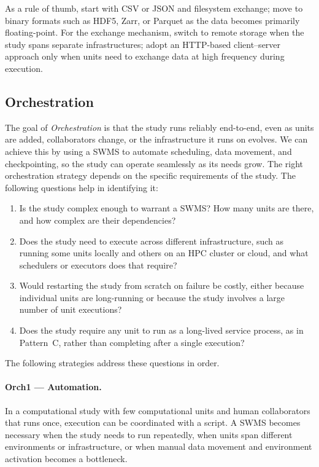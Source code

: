 \documentclass{eceasst}
\begin{document}
As a rule of thumb, start with CSV or JSON and filesystem exchange; move to
binary formats such as HDF5, Zarr, or Parquet as the data becomes
primarily floating-point. For the exchange mechanism, switch to remote storage
when the study spans separate infrastructures; adopt an HTTP-based client--server
approach only when units need to exchange data at high frequency during
execution.


\subsection{Orchestration}
\label{sec:orchestration}

The goal of \emph{Orchestration} is that the study runs reliably end-to-end, even as
units are added, collaborators change, or the infrastructure it runs on evolves.
We can achieve this by using a SWMS to automate
scheduling, data movement, and checkpointing, so the study can operate
seamlessly as its needs grow.
The right orchestration strategy depends on the specific requirements of the
study. The following questions help in identifying it:

\begin{enumerate}
  \item Is the study complex enough to warrant a SWMS? How many units
        are there, and how complex are their dependencies?
  \item Does the study need to execute across different infrastructure, such as
        running some units locally and others on an HPC cluster or cloud, and
        what schedulers or executors does that require?
  \item Would restarting the study from scratch on failure be costly, either
        because individual units are long-running or because the study involves
        a large number of unit executions?
  \item Does the study require any unit to run as a long-lived service process,
        as in Pattern~C, rather than completing after a single execution?
\end{enumerate}

The following strategies address these questions in order.

\paragraph{Orch1 --- Automation.}
In a computational study with few computational units and human collaborators
that runs once, execution can be coordinated with a script. A SWMS becomes
necessary when the study needs to run repeatedly, when units span different
environments or infrastructure, or when manual data movement and environment
activation becomes a bottleneck.
\end{document}
